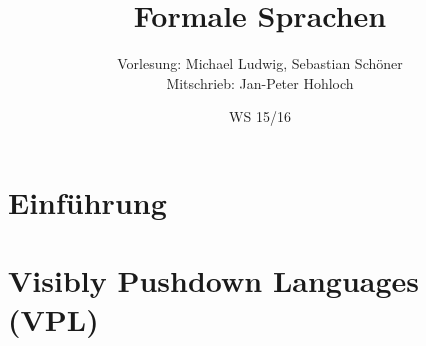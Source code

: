 \documentclass[german,a4paper,10pt]{scrreprt}
\title{Formale Sprachen}
\author{Vorlesung: Michael Ludwig, Sebastian Schöner\\
Mitschrieb: Jan-Peter Hohloch}
\date{WS 15/16}
\begin{document}
    \maketitle
    \tableofcontents
    \newpage
    \chapter{Einführung}
        
    \chapter{Visibly Pushdown Languages (VPL)}
        
\end{document}
